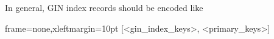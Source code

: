 In general, GIN index records should be encoded like

\begin{textcode*}{frame=none,xleftmargin=10pt}
[<gin_index_keys>, <primary_keys>]
\end{textcode*}
